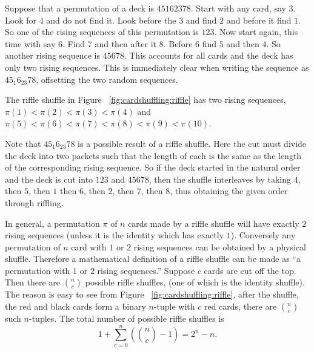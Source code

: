 \documentclass[12pt]{article}
\begin{document}
\begin{example}
    Suppose that a permutation of a deck is \( 45162378 \).  Start with
    any card, say \( 3 \).  Look for \( 4 \) and do not find it.  Look
    before the \( 3 \) and find \( 2 \) and before it find \( 1 \).  So
    one of the rising sequences of this permutation is \( 123 \).  Now
    start again, this time with say \( 6 \).  Find \( 7 \) and then
    after it \( 8 \).  Before \( 6 \) find \( 5 \) and then \( 4 \).  So
    another rising sequence is \( 45678 \).  This accounts for all cards
    and the deck has only two rising sequences.  This is immediately
    clear when writing the sequence as \( 45_{1}6_{23}78 \), offsetting
    the two random sequences.
\end{example}

\begin{example}
    The riffle shuffle in Figure~%
    \ref{fig:cardshuffling:riffle} has two rising sequences, \( \pi(1) <
    \pi(2) < \pi(3) < \pi(4) \) and \( \pi(5) < \pi(6) < \pi(7) < \pi(8)
    < \pi(9) < \pi(10) \).
\end{example}

\begin{example}
    Note that \( 45_{1}6_{23}78 \) is a possible result of a riffle
    shuffle. Here the cut must divide the deck into two packets such
    that the length of each is the same as the length of the
    corresponding rising sequence.  So if the deck started in the
    natural order and the deck is cut into \( 123 \) and \( 45678 \),
    then the shuffle interleaves by taking \( 4 \), then \( 5 \), then \(
    1 \) then \( 6 \), then \( 2 \), then \( 7 \), then \( 8 \), thus
    obtaining the given order through riffling.
\end{example}

In general, a permutation \( \pi \) of \( n \) cards made by a riffle
shuffle will have exactly \( 2 \) rising sequences (unless it is the
identity which has exactly \( 1 \)).  Conversely any permutation of \( n
\) card with \( 1 \) or \( 2 \) rising sequences can be obtained by a
physical shuffle. Therefore a mathematical definition of a riffle
shuffle can be made as ``a permutation with \( 1 \) or \( 2 \) rising
sequences.'' Suppose \( c \) cards are cut off the top.  Then there are \(
\binom{n}{c} \) possible riffle shuffles, (one of which is the identity
shuffle).  The reason is easy to see from Figure~%
\ref{fig:cardshuffling:riffle}, after the shuffle, the red and black
cards form a binary \( n \)-tuple with \( c \) red cards, there are \(
\binom{n}{c} \) such \( n \)-tuples.  The total number of possible
riffle shuffles is
\[
    1 + \sum\limits_{c=0}^n \left( \binom{n}{c} - 1\right) = 2^n - n.
\]
\end{document}
